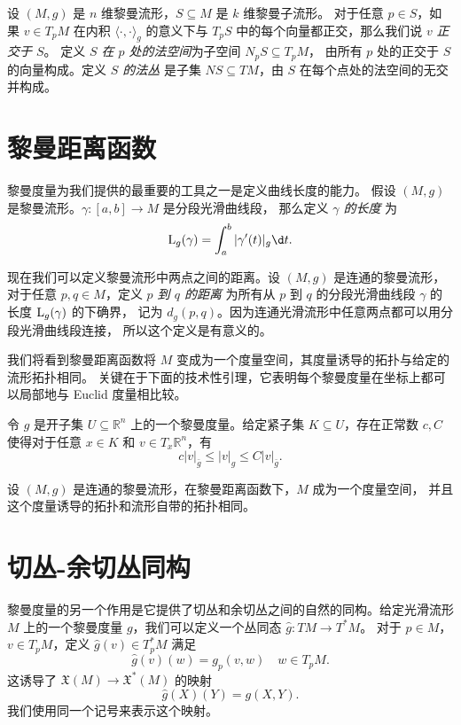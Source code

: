 设 $(M,g)$ 是 $n$ 维黎曼流形，$S\subseteq M$ 是 $k$ 维黎曼子流形。
对于任意 $p\in S$，如果 $v\in T_pM$ 在内积 $\langle\cdot,\cdot\rangle_g$
的意义下与 $T_pS$ 中的每个向量都正交，那么我们说 $v$ \emph{正交于 $S$}。
定义 \emph{$S$ 在 $p$ 处的法空间}为子空间 $N_pS\subseteq T_pM$，
由所有 $p$ 处的正交于 $S$ 的向量构成。定义 \emph{$S$ 的法丛}
是子集 $NS\subseteq TM$，由 $S$ 在每个点处的法空间的无交并构成。

\section{黎曼距离函数}

黎曼度量为我们提供的最重要的工具之一是定义曲线长度的能力。
假设 $(M,g)$ 是黎曼流形。$\gamma:[a,b]\to M$ 是分段光滑曲线段，
那么定义 \emph{$\gamma$ 的长度} 为
\[
  \LL_g(\gamma)=\int_a^b|\gamma'(t)|_g \d t.  
\]

现在我们可以定义黎曼流形中两点之间的距离。设 $(M,g)$ 是连通的黎曼流形，
对于任意 $p,q\in M$，定义 \emph{$p$ 到 $q$ 的距离} 为所有从 $p$
到 $q$ 的分段光滑曲线段 $\gamma$ 的长度 ${\mathrm{L}}_g(\gamma)$ 的下确界，
记为 $d_g(p,q)$。因为连通光滑流形中任意两点都可以用分段光滑曲线段连接，
所以这个定义是有意义的。

我们将看到黎曼距离函数将 $M$ 变成为一个度量空间，其度量诱导的拓扑与给定的流形拓扑相同。
关键在于下面的技术性引理，它表明每个黎曼度量在坐标上都可以局部地与 Euclid 度量相比较。

\begin{lemma}
  令 $g$ 是开子集 $U\subseteq \mathbb{R}^n$ 上的一个黎曼度量。给定紧子集 
  $K\subseteq U$，存在正常数 $c,C$ 使得对于任意 $x\in K$ 和 $v\in T_x \mathbb{R}^n$，有
  \[
    c|v|_{\bar g}\leq |v|_g\leq C|v|_{\bar g}.  
  \]
\end{lemma}

\begin{theorem}[黎曼流形作为度量空间]
  设 $(M,g)$ 是连通的黎曼流形，在黎曼距离函数下，$M$ 成为一个度量空间，
  并且这个度量诱导的拓扑和流形自带的拓扑相同。
\end{theorem}


\section{切丛-余切丛同构}

黎曼度量的另一个作用是它提供了切丛和余切丛之间的自然的同构。给定光滑流形 $M$
上的一个黎曼度量 $g$，我们可以定义一个丛同态 $\hat g:TM\to T^*M$。
对于 $p\in M$，$v\in T_pM$，定义 $\hat g(v)\in T_p^*M$ 满足
\[
  \hat g(v)(w)=g_p(v,w)\quad w\in T_pM.  
\]
这诱导了 $\mathfrak{X}(M)\to \mathfrak{X}^*(M)$ 的映射
\[
  \hat g(X)(Y)=g(X,Y).   
\]
我们使用同一个记号来表示这个映射。

